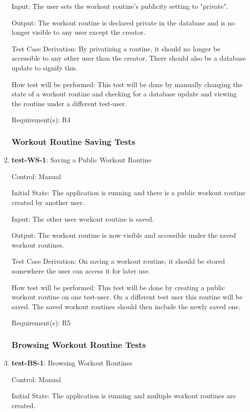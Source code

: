 \documentclass[12pt, titlepage]{article}
\begin{document}
\begin{enumerate}
		Input: The user sets the workout routine's publicity setting to "private".
		
		Output: The workout routine is declared private in the database and is no longer visible to any user except the creator.
		
		Test Case Derivation: By privatizing a routine, it should no longer be accessible to any other user than the creator. There should also be a database update to signify this.
		
		How test will be performed: This test will be done by manually changing the state of a workout routine and checking for a database update and viewing the routine under a different test-user.
		
		Requirement(s): R4
		
		\subsubsection{Workout Routine Saving Tests}
	
		\item{\textbf{test-WS-1}}: Saving a Public Workout Routine
		
		Control: Manual
		
		Initial State: The application is running and there is a public workout routine created by another user.
		
		Input: The other user workout routine is saved.
		
		Output: The workout routine is now visible and accessible under the saved workout routines.
		
		Test Case Derivation: On saving a workout routine, it should be stored somewhere the user can access it for later use.
		
		How test will be performed: This test will be done by creating a public workout routine on one test-user. On a different test user this routine will be saved. The saved workout routines should then include the newly saved one.
		
		Requirement(s): R5
		
		\subsubsection{Browsing Workout Routine Tests}
		\item{\textbf{test-BS-1}}: Browsing Workout Routines
		
		Control: Manual
		
		Initial State: The application is running and multiple workout routines are created.
		

\end{enumerate}
\end{document}
